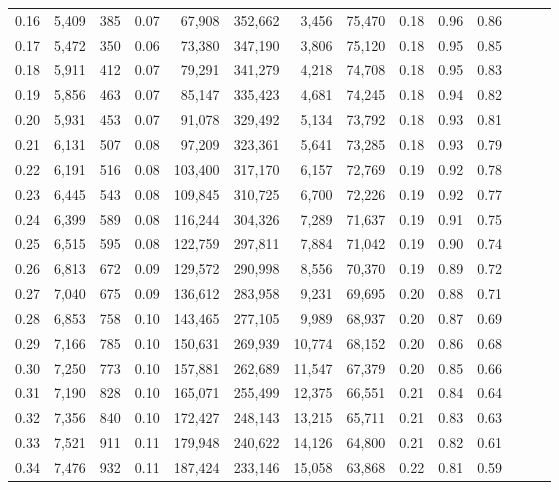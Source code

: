 \begin{tabular}{rrrrrrrrrrrrrr}
0.16 &  5,409 &    385 &  0.07 &   67,908 &  352,662 &   3,456 &  75,470 &  0.18 &  0.96 &      0.86 \\
0.17 &  5,472 &    350 &  0.06 &   73,380 &  347,190 &   3,806 &  75,120 &  0.18 &  0.95 &      0.85 \\
0.18 &  5,911 &    412 &  0.07 &   79,291 &  341,279 &   4,218 &  74,708 &  0.18 &  0.95 &      0.83 \\
0.19 &  5,856 &    463 &  0.07 &   85,147 &  335,423 &   4,681 &  74,245 &  0.18 &  0.94 &      0.82 \\
0.20 &  5,931 &    453 &  0.07 &   91,078 &  329,492 &   5,134 &  73,792 &  0.18 &  0.93 &      0.81 \\
0.21 &  6,131 &    507 &  0.08 &   97,209 &  323,361 &   5,641 &  73,285 &  0.18 &  0.93 &      0.79 \\
0.22 &  6,191 &    516 &  0.08 &  103,400 &  317,170 &   6,157 &  72,769 &  0.19 &  0.92 &      0.78 \\
0.23 &  6,445 &    543 &  0.08 &  109,845 &  310,725 &   6,700 &  72,226 &  0.19 &  0.92 &      0.77 \\
0.24 &  6,399 &    589 &  0.08 &  116,244 &  304,326 &   7,289 &  71,637 &  0.19 &  0.91 &      0.75 \\
0.25 &  6,515 &    595 &  0.08 &  122,759 &  297,811 &   7,884 &  71,042 &  0.19 &  0.90 &      0.74 \\
0.26 &  6,813 &    672 &  0.09 &  129,572 &  290,998 &   8,556 &  70,370 &  0.19 &  0.89 &      0.72 \\
0.27 &  7,040 &    675 &  0.09 &  136,612 &  283,958 &   9,231 &  69,695 &  0.20 &  0.88 &      0.71 \\
0.28 &  6,853 &    758 &  0.10 &  143,465 &  277,105 &   9,989 &  68,937 &  0.20 &  0.87 &      0.69 \\
0.29 &  7,166 &    785 &  0.10 &  150,631 &  269,939 &  10,774 &  68,152 &  0.20 &  0.86 &      0.68 \\
0.30 &  7,250 &    773 &  0.10 &  157,881 &  262,689 &  11,547 &  67,379 &  0.20 &  0.85 &      0.66 \\
0.31 &  7,190 &    828 &  0.10 &  165,071 &  255,499 &  12,375 &  66,551 &  0.21 &  0.84 &      0.64 \\
0.32 &  7,356 &    840 &  0.10 &  172,427 &  248,143 &  13,215 &  65,711 &  0.21 &  0.83 &      0.63 \\
0.33 &  7,521 &    911 &  0.11 &  179,948 &  240,622 &  14,126 &  64,800 &  0.21 &  0.82 &      0.61 \\
0.34 &  7,476 &    932 &  0.11 &  187,424 &  233,146 &  15,058 &  63,868 &  0.22 &  0.81 &      0.59 \\

\end{tabular}
